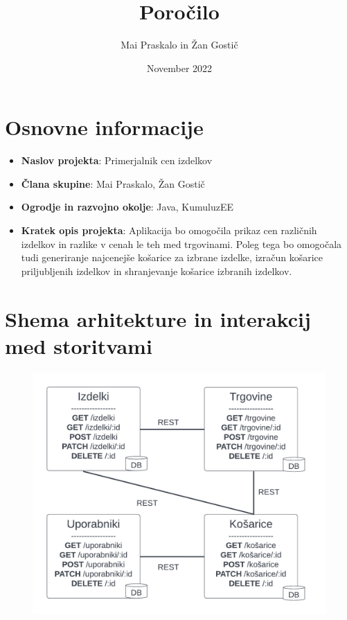 \documentclass{article}
\title{Poročilo}
\author{Mai Praskalo in Žan Gostič}
\date{November 2022}
\begin{document}
\maketitle

\section{Osnovne informacije}

\begin{itemize}
    \item \textbf{Naslov projekta}: Primerjalnik cen izdelkov
    \item \textbf{Člana skupine}: Mai Praskalo, Žan Gostič
    \item \textbf{Ogrodje in razvojno okolje}: Java, KumuluzEE
    \item  \textbf{Kratek opis projekta}: Aplikacija bo omogočila prikaz cen različnih izdelkov in razlike v cenah le teh med trgovinami. Poleg tega bo omogočala tudi generiranje najcenejše košarice za izbrane izdelke, izračun košarice priljubljenih izdelkov in shranjevanje košarice izbranih izdelkov.
\end{itemize}
\pagebreak
\section{Shema arhitekture in interakcij med storitvami}

\begin{figure}[h]
\includegraphics{schema.png}
\centering
\end{figure}
\end{document}
